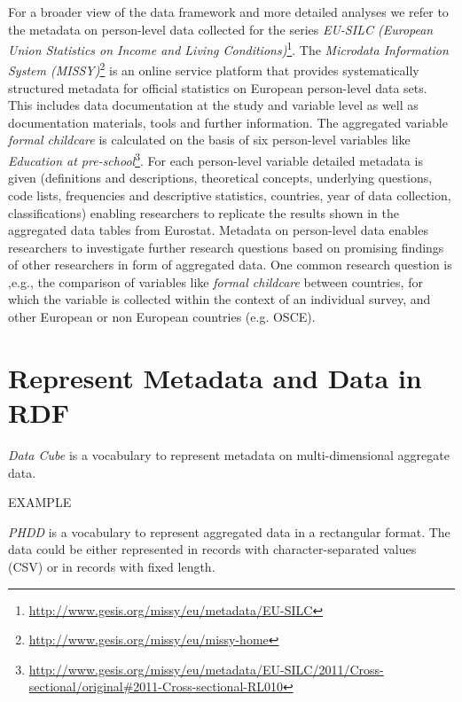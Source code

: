 \documentclass{llncs}
\begin{document}
For a broader view of the data framework and more detailed analyses we refer to the metadata on person-level data collected for the series \emph{EU-SILC (European Union Statistics on Income and Living Conditions)}\footnote{\url{http://www.gesis.org/missy/eu/metadata/EU-SILC}}.
The \emph{Microdata Information System (MISSY)}\footnote{\url{http://www.gesis.org/missy/eu/missy-home}} is an online service platform that provides systematically structured metadata for official statistics on European person-level data sets. This includes data documentation at the study and variable level as well as documentation materials, tools and further information. 
The aggregated variable \emph{formal childcare} is calculated on the basis of six person-level variables like 
\emph{Education at pre-school}\footnote{\url{http://www.gesis.org/missy/eu/metadata/EU-SILC/2011/Cross-sectional/original#2011-Cross-sectional-RL010}}.
For each person-level variable detailed metadata is given (definitions and descriptions, theoretical concepts, underlying questions, code lists, frequencies and descriptive statistics, countries, year of data collection, classifications) enabling researchers to replicate the results shown in the aggregated data tables from Eurostat.
Metadata on person-level data enables researchers to investigate further research questions based on promising findings of other researchers in form of aggregated data.
One common research question is ,e.g., the comparison of variables like 
\emph{formal childcare} between countries, for which the variable is collected within the context of an individual survey, and other European or non European countries (e.g. OSCE).

\section{Represent Metadata and Data in RDF}
\label{rdf-representation}

\emph{Data Cube} is a vocabulary to represent metadata on multi-dimensional aggregate data.

\begin{ex}
EXAMPLE
\end{ex}

\emph{PHDD} is a vocabulary to represent aggregated data in a rectangular format. 
The data could be either represented in records with character-separated values (CSV) or in records with fixed length. 
\end{document}
